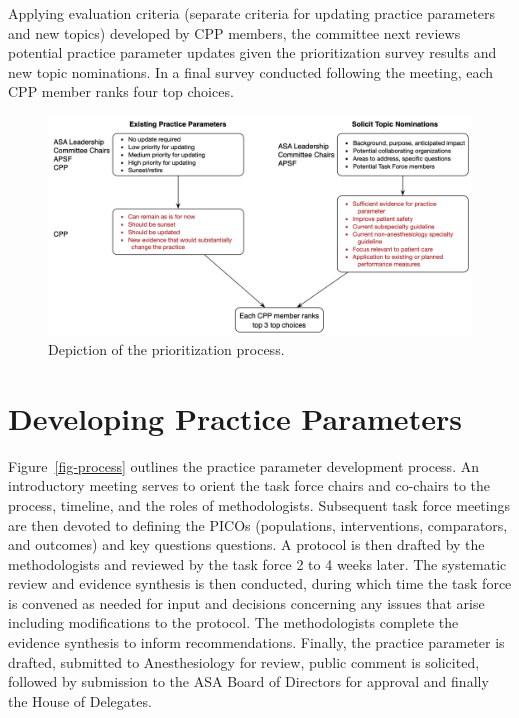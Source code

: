 \documentclass[
  letterpaper,
  DIV=11,
  numbers=noendperiod]{scrreprt}
\begin{document}
Applying evaluation criteria (separate criteria for updating practice
parameters and new topics) developed by CPP members, the committee next
reviews potential practice parameter updates given the prioritization
survey results and new topic nominations. In a final survey conducted
following the meeting, each CPP member ranks four top choices.

\begin{figure}

\caption{\label{fig-prioritization}Depiction of the prioritization
process.}

{\centering \includegraphics[width=1\textwidth,height=\textheight]{assets/prioritization.png}

}

\end{figure}

\hypertarget{developing-practice-parameters}{%
\section{Developing Practice
Parameters}\label{developing-practice-parameters}}

Figure~\ref{fig-process} outlines the practice parameter development
process. An introductory meeting serves to orient the task force chairs
and co-chairs to the process, timeline, and the roles of methodologists.
Subsequent task force meetings are then devoted to defining the PICOs
(populations, interventions, comparators, and outcomes) and key
questions questions. A protocol is then drafted by the methodologists
and reviewed by the task force 2 to 4 weeks later. The systematic review
and evidence synthesis is then conducted, during which time the task
force is convened as needed for input and decisions concerning any
issues that arise including modifications to the protocol. The
methodologists complete the evidence synthesis to inform
recommendations. Finally, the practice parameter is drafted, submitted
to Anesthesiology for review, public comment is solicited, followed by
submission to the ASA Board of Directors for approval and finally the
House of Delegates.
\end{document}
